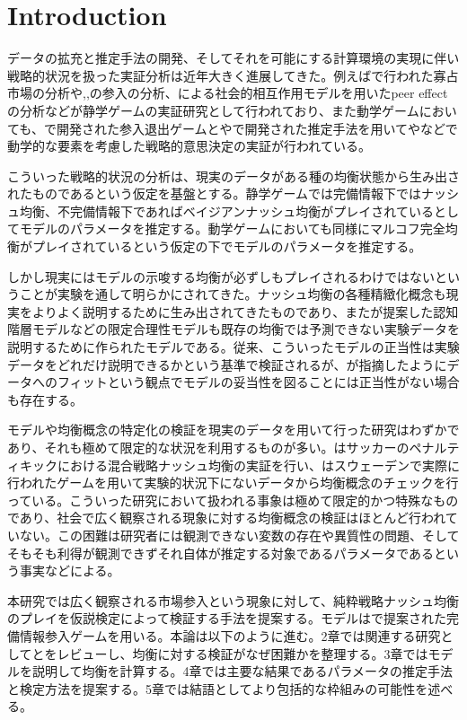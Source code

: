 
\section{Introduction}
データの拡充と推定手法の開発、そしてそれを可能にする計算環境の実現に伴い戦略的状況を扱った実証分析は近年大きく進展してきた。例えば\cite{Publishing2010}で行われた寡占市場の分析や\cite{Bresnahan1991},\cite{Tamer2003a},\cite{Seim2006}の参入の分析、\cite{Brock2001a}による社会的相互作用モデルを用いたpeer effectの分析などが静学ゲームの実証研究として行われており、また動学ゲームにおいても、\cite{Pakes1994}で開発された参入退出ゲームと\cite{Aguirregabiria2007}や\cite{Bajari2007}で開発された推定手法を用いて\cite{Exler2013}や\cite{Ryan2012}などで動学的な要素を考慮した戦略的意思決定の実証が行われている。

こういった戦略的状況の分析は、現実のデータがある種の均衡状態から生み出されたものであるという仮定を基盤とする。静学ゲームでは完備情報下ではナッシュ均衡、不完備情報下であればベイジアンナッシュ均衡がプレイされているとしてモデルのパラメータを推定する。動学ゲームにおいても同様にマルコフ完全均衡がプレイされているという仮定の下でモデルのパラメータを推定する。

しかし現実にはモデルの示唆する均衡が必ずしもプレイされるわけではないということが実験を通して明らかにされてきた。ナッシュ均衡の各種精緻化概念も現実をよりよく説明するために生み出されてきたものであり、また\cite{Economics2014}が提案した認知階層モデルなどの限定合理性モデルも既存の均衡では予測できない実験データを説明するために作られたモデルである。従来、こういったモデルの正当性は実験データをどれだけ説明できるかという基準で検証されるが、\cite{Haile2016}が指摘したようにデータへのフィットという観点でモデルの妥当性を図ることには正当性がない場合も存在する。

モデルや均衡概念の特定化の検証を現実のデータを用いて行った研究はわずかであり、それも極めて限定的な状況を利用するものが多い。\cite{Chiappori2002}はサッカーのペナルティキックにおける混合戦略ナッシュ均衡の実証を行い、\cite{Ostling2011}はスウェーデンで実際に行われたゲームを用いて実験的状況下にないデータから均衡概念のチェックを行っている。こういった研究において扱われる事象は極めて限定的かつ特殊なものであり、社会で広く観察される現象に対する均衡概念の検証はほとんど行われていない。この困難は研究者には観測できない変数の存在や異質性の問題、そしてそもそも利得が観測できずそれ自体が推定する対象であるパラメータであるという事実などによる。

本研究では広く観察される市場参入という現象に対して、純粋戦略ナッシュ均衡のプレイを仮説検定によって検証する手法を提案する。モデルは\cite{Bresnahan1991}で提案された完備情報参入ゲームを用いる。本論は以下のように進む。2章では関連する研究として\cite{Ostling2011}と\cite{Chiappori2002}をレビューし、均衡に対する検証がなぜ困難かを整理する。3章ではモデルを説明して均衡を計算する。4章では主要な結果であるパラメータの推定手法と検定方法を提案する。5章では結語としてより包括的な枠組みの可能性を述べる。
